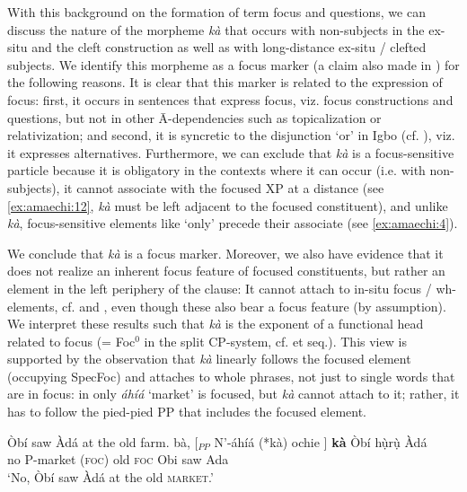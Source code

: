 \documentclass[output=paper,colorlinks,citecolor=brown]{langscibook}
\begin{document}
With this background on the formation of term focus and questions, we can discuss the nature of the morpheme \textit{k\`a} that occurs with non-subjects in the ex-situ and the cleft construction as well as with long-distance ex-situ / clefted subjects. We identify this morpheme as a focus marker (a claim also  made in \citealt{Osuagwu2015}) for the following reasons. It is clear that this marker is related to the expression of focus: first, it occurs in sentences that express focus, viz. focus constructions and questions, but not in other \=A-dependencies such as topicalization or relativization; and second, it is syncretic to the disjunction `or' in Igbo (cf. \citealt{Nwachukwu1987}), viz. it expresses alternatives. Furthermore, we can exclude that \textit{k\`a} is a focus-sensitive particle because it is obligatory in the contexts where it can occur (i.e. with non-subjects), it cannot associate with the focused XP at a distance (see \ref{ex:amaechi:12}, \textit{k\`a} must be left adjacent to the focused constituent), and unlike \textit{k\`a}, focus-sensitive elements like `only' precede their associate (see \ref{ex:amaechi:4}).

\z

We conclude that \textit{k\`a} is a focus marker. Moreover, we also have evidence that it does not realize an inherent focus feature of focused constituents, but rather an element in the left periphery of the clause:  It  cannot attach to in-situ focus / wh-elements, cf.  and , even though these also bear a focus feature (by assumption). We interpret these results such that \textit{k\`a} is the exponent of a functional head related to focus (= Foc$^{0}$ in the split CP-system, cf. \citealt{Rizzi1997} et seq.). This view is supported by the observation that \textit{k\`a} linearly follows the focused element (occupying SpecFoc) and attaches to whole phrases, not just to single words that are in focus: in  only \textit{áhíá} `market' is focused, but \textit{k\`a} cannot  attach to it; rather, it has to follow the pied-pied PP that includes the focused element.

\ea%
    \label{ex:amaechi:13}
    \ea\label{ex:amaechi:13a}
        Òbí saw Àdá at the old farm.
    \ex\label{ex:amaechi:13b}
        bà, [$_{PP}$ N'-áhíá (*kà) ochie ] \textbf{kà} {} Òbí hụ̀rụ̀ Àdá\\
                no {} P-market (\textsc{foc}) old {} \textsc{foc} {} Obi saw Ada\\
        \glt    `No, Òbí saw Àdá at the {old} \textsc{market}.'%
    \z
\z
\end{document}
